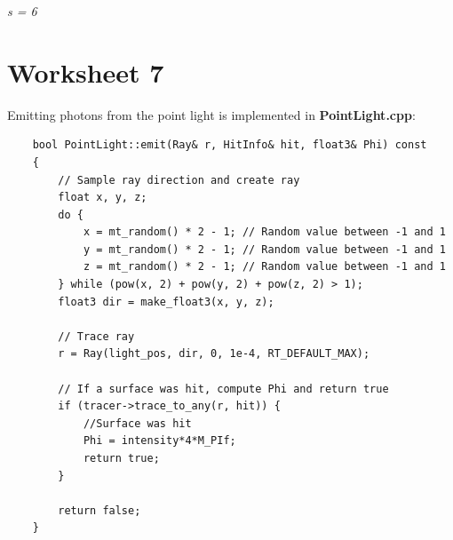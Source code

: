 \documentclass[a4,12pt]{article}
\begin{document}
\begin{center}
\begin{minipage}[b]{0.40\linewidth}
\begin{center}
				\textit{s = 6}
			\end{center}
		\end{minipage}
	\end{center}
	
	\section{Worksheet 7}
	Emitting photons from the point light is implemented in \textbf{PointLight.cpp}:
	
	\begin{lstlisting}
	bool PointLight::emit(Ray& r, HitInfo& hit, float3& Phi) const
	{		
		// Sample ray direction and create ray
		float x, y, z;
		do {
			x = mt_random() * 2 - 1; // Random value between -1 and 1
			y = mt_random() * 2 - 1; // Random value between -1 and 1
			z = mt_random() * 2 - 1; // Random value between -1 and 1
		} while (pow(x, 2) + pow(y, 2) + pow(z, 2) > 1);
		float3 dir = make_float3(x, y, z);
		
		// Trace ray
		r = Ray(light_pos, dir, 0, 1e-4, RT_DEFAULT_MAX);
		
		// If a surface was hit, compute Phi and return true
		if (tracer->trace_to_any(r, hit)) {
			//Surface was hit
			Phi = intensity*4*M_PIf;
			return true;
		}
		
		return false;
	}
	\end{lstlisting}
	
\end{document}

